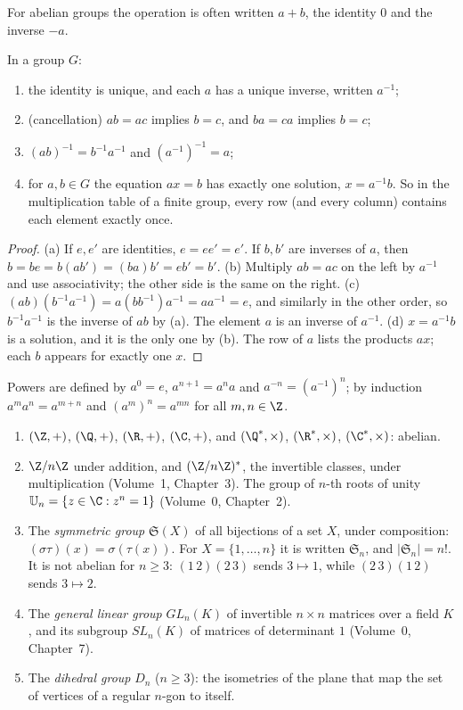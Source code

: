For abelian groups the operation is often written $a+b$, the identity $0$ and the inverse $-a$.

\begin{proposition}\label{prop:rules}
In a group $G$:
\begin{enumerate}[label=(\alph*)]
\item the identity is unique, and each $a$ has a unique inverse, written $a^{-1}$;
\item (cancellation) $ab=ac$ implies $b=c$, and $ba=ca$ implies $b=c$;
\item $(ab)^{-1}=b^{-1}a^{-1}$ and $(a^{-1})^{-1}=a$;
\item for $a,b\in G$ the equation $ax=b$ has exactly one solution, $x=a^{-1}b$. So in the multiplication table of a finite group, every row (and every column) contains each element exactly once.
\end{enumerate}
\end{proposition}
\begin{proof}
(a) If $e,e'$ are identities, $e=ee'=e'$. If $b,b'$ are inverses of $a$, then $b=be=b(ab')=(ba)b'=eb'=b'$.
(b) Multiply $ab=ac$ on the left by $a^{-1}$ and use associativity; the other side is the same on the right.
(c) $(ab)(b^{-1}a^{-1})=a(bb^{-1})a^{-1}=aa^{-1}=e$, and similarly in the other order, so $b^{-1}a^{-1}$ is the inverse of $ab$ by (a). The element $a$ is an inverse of $a^{-1}$.
(d) $x=a^{-1}b$ is a solution, and it is the only one by (b). The row of $a$ lists the products $ax$; each $b$ appears for exactly one $x$.
\end{proof}

Powers are defined by $a^0=e$, $a^{n+1}=a^na$ and $a^{-n}=(a^{-1})^n$; by induction $a^ma^n=a^{m+n}$ and $(a^m)^n=a^{mn}$ for all $m,n\in\Z$.

\begin{example}\label{ex:examples}
\begin{enumerate}[label=(\arabic*)]
\item $(\Z,+)$, $(\Q,+)$, $(\R,+)$, $(\C,+)$, and $(\Q^*,\times)$, $(\R^*,\times)$, $(\C^*,\times)$: abelian.
\item $\Z/n\Z$ under addition, and $(\Z/n\Z)^*$, the invertible classes, under multiplication (Volume~1, Chapter~3). The group of $n$-th roots of unity $\mathbb U_n=\{z\in\C:z^n=1\}$ (Volume~0, Chapter~2).
\item The \emph{symmetric group} $\mathfrak S(X)$ of all bijections of a set $X$, under composition: $(\sigma\tau)(x)=\sigma(\tau(x))$. For $X=\{1,\dots,n\}$ it is written $\mathfrak S_n$, and $|\mathfrak S_n|=n!$. It is not abelian for $n\ge3$: $(1\,2)(2\,3)$ sends $3\mapsto1$, while $(2\,3)(1\,2)$ sends $3\mapsto2$.
\item The \emph{general linear group} $GL_n(K)$ of invertible $n\times n$ matrices over a field $K$, and its subgroup $SL_n(K)$ of matrices of determinant $1$ (Volume~0, Chapter~7).
\item The \emph{dihedral group} $D_n$ ($n\ge3$): the isometries of the plane that map the set of vertices of a regular $n$-gon to itself.
\end{enumerate}
\end{example}

